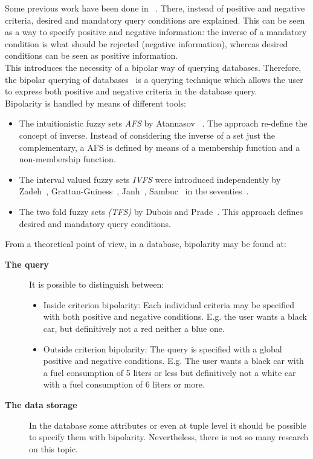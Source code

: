 Some previous work have been done in ~\cite{Lacroix87}. There, instead of positive and negative criteria, desired and mandatory query conditions are explained. This can be seen as a way to specify positive and negative information: the inverse of a mandatory condition is what should be rejected (negative information), whereas desired conditions can be seen as positive information.\\


This introduces the necessity of a bipolar way of querying databases. Therefore, the bipolar querying of databases~\cite{DeTre2009} is a querying technique which allows the user to express both positive and negative criteria in the database query.\\

Bipolarity is handled by means of different tools:

\begin{itemize}
\item
The intuitionistic fuzzy sets  \emph{AFS} by Atannasov ~\cite{Atanassov1986}. The approach re-define the concept of inverse. Instead of considering the inverse of a set just the complementary, a AFS is defined by means of a membership function and a non-membership function.
\item
The interval valued fuzzy sets \emph{IVFS} were introduced independently by Zadeh~\cite{Zadeh75a}, Grattan-Guiness~\cite{Grattan76}, Janh~\cite{Jahn75}, Sambuc~\cite{Sambuc75} in the seventies~\cite{Dubois05}. %
\item
The two fold fuzzy sets \emph{(TFS)} by Dubois and Prade~\cite{Dubois02}. This approach defines desired and mandatory query conditions.
\end{itemize}

From a theoretical point of view, in a database, bipolarity may be found at:
\begin{description}
\item[\textbf{The query}] It is possible to distinguish between:
	\begin{itemize}
	\item
	Inside criterion bipolarity: Each individual criteria may be specified with both positive and negative conditions. E.g. the user wants a black car, but definitively not a red neither a blue one.
	\item
	Outside criterion bipolarity: The query is specified with a global positive and negative conditions. E.g. The user wants a black car with a fuel consumption of 5 liters or less but definitively not a white car with a fuel consumption of 6 liters or more. 
	\end{itemize}
\item[\textbf{The data storage}] In the database some attributes or even at tuple level it should be possible to specify them with bipolarity. Nevertheless, there is not so many research on this topic.
\end{description}

